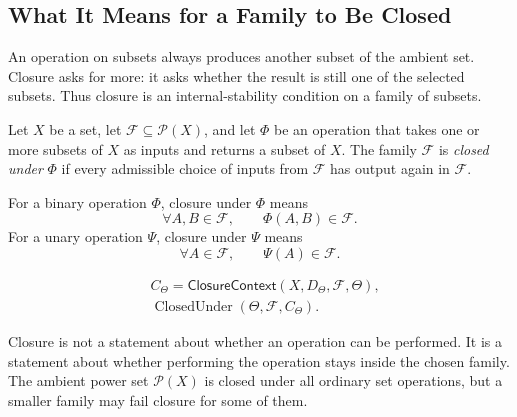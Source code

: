 \subsection{What It Means for a Family to Be Closed}

\begin{remark*}[Exposition]
An operation on subsets always produces another subset of the ambient set.
Closure asks for more: it asks whether the result is still one of the selected
subsets.  Thus closure is an internal-stability condition on a family of
subsets.
\end{remark*}

\begin{definition}\label{def:closed-under-operation}
Let \(X\) be a set, let \(\mathcal{F}\subseteq\mathcal{P}(X)\), and let
\(\Phi\) be an operation that takes one or more subsets of \(X\) as inputs and
returns a subset of \(X\).  The family \(\mathcal{F}\) is \emph{closed under}
\(\Phi\) if every admissible choice of inputs from \(\mathcal{F}\) has output
again in \(\mathcal{F}\).
\end{definition}

\begin{remark*}
For a binary operation \(\Phi\), closure under \(\Phi\) means
\[
  \forall A,B\in\mathcal{F},\qquad
  \Phi(A,B)\in\mathcal{F}.
\]
For a unary operation \(\Psi\), closure under \(\Psi\) means
\[
  \forall A\in\mathcal{F},\qquad
  \Psi(A)\in\mathcal{F}.
\]
\end{remark*}

\begin{remark*}
\[
\begin{aligned}
&C_{\Theta}=\mathsf{ClosureContext}(X,D_{\Theta},\mathcal{F},\Theta),\\
&\operatorname{ClosedUnder}(\Theta,\mathcal{F},C_{\Theta}).
\end{aligned}
\]
\end{remark*}

\begin{remark*}[Interpretation]
Closure is not a statement about whether an operation can be performed.  It is
a statement about whether performing the operation stays inside the chosen
family.  The ambient power set \(\mathcal{P}(X)\) is closed under all ordinary
set operations, but a smaller family may fail closure for some of them.
\end{remark*}

